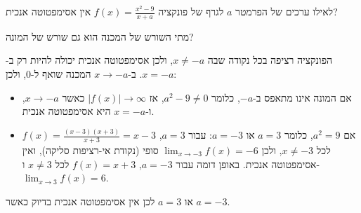 
\begin{question}
לאילו ערכים של הפרמטר $a$ לגרף של פונקציה $f(x)=\frac{x^2-9}{x+a}$ אין אסימפטוטה אנכית?
\end{question}

\begin{hint}
מתי השורש של המכנה הוא גם שורש של המונה?
\end{hint}

\begin{solution}
הפונקציה רציפה בכל נקודה שבה $x\neq -a$, ולכן אסימפטוטה אנכית יכולה להיות רק ב-$x=-a$. ב-$x\to-a$ המכנה שואף ל-$0$, ולכן:
\begin{itemize}
  \item אם המונה אינו מתאפס ב-$-a$, כלומר $a^2-9\neq0$, אז $|f(x)|\to\infty$ כאשר $x\to-a$, ו-$x=-a$ היא אסימפטוטה אנכית.
  \item אם $a^2=9$, כלומר $a=3$ או $a=-3$: עבור $a=3$, $f(x)=\frac{(x-3)(x+3)}{x+3}=x-3$ לכל $x\neq-3$, ולכן $\lim_{x\to-3}f(x)=-6$ סופי (נקודת אי-רציפות סליקה), ואין אסימפטוטה אנכית. באופן דומה עבור $a=-3$, $f(x)=x+3$ לכל $x\neq3$ ו-$\lim_{x\to3}f(x)=6$.
\end{itemize}
לכן אין אסימפטוטה אנכית בדיוק כאשר $\boxed{a=3 \text{ או } a=-3}$.
\end{solution}
